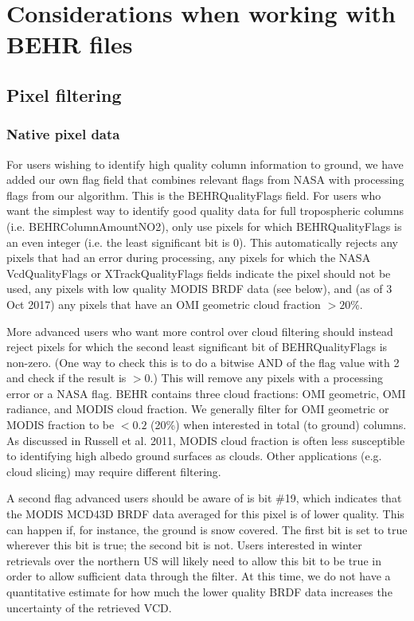 \documentclass[12pt]{article}
\begin{document}
\FloatBarrier

\section{Considerations when working with BEHR files}
	\subsection{Pixel filtering}
	\subsubsection{Native pixel data} \label{sec:native-filtering}
	
	For users wishing to identify high quality  column information to ground, we have added our own flag field that combines relevant flags from NASA with processing flags from our algorithm. This is the BEHRQualityFlags field.  For users who want the simplest way to identify good quality data for full tropospheric columns (i.e. BEHRColumnAmountNO2), only use pixels for which BEHRQualityFlags is an even integer (i.e. the least significant bit is 0). This automatically rejects any pixels that had an error during processing, any pixels for which the NASA VcdQualityFlags or XTrackQualityFlags fields indicate the pixel should not be used, any pixels with low quality MODIS BRDF data (see below), and (as of 3 Oct 2017) any pixels that have an OMI geometric cloud fraction $> 20\%$.
	
	More advanced users who want more control over cloud filtering should instead reject pixels for which the second least significant bit of BEHRQualityFlags is non-zero. (One way to check this is to do a bitwise AND of the flag value with 2 and check if the result is $> 0$.) This will remove any pixels with a processing error or a NASA flag. BEHR contains three cloud fractions: OMI geometric, OMI radiance, and MODIS cloud fraction. We generally filter for OMI geometric or MODIS fraction to be $< 0.2$ (20\%) when interested in total (to ground) columns.  As discussed in Russell et al. 2011, MODIS cloud fraction is often less susceptible to identifying high albedo ground surfaces as clouds. Other applications (e.g. cloud slicing) may require different filtering.
	
	A second flag advanced users should be aware of is bit \#19, which indicates that the MODIS MCD43D BRDF data averaged for this pixel is of lower quality. This can happen if, for instance, the ground is snow covered. The first bit is set to true wherever this bit is true; the second bit is not. Users interested in winter retrievals over the northern US will likely need to allow this bit to be true in order to allow sufficient data through the filter. At this time, we do not have a quantitative estimate for how much the lower quality BRDF data increases the uncertainty of the retrieved VCD.
	
\end{document}
